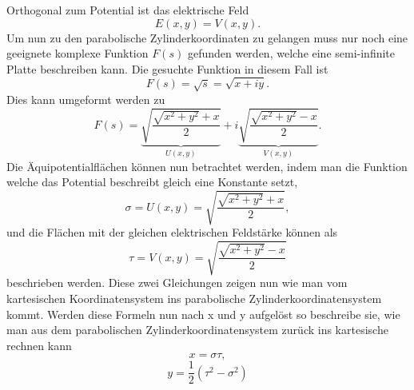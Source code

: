 Orthogonal zum Potential ist das elektrische Feld
\begin{equation}
	E(x,y) = V(x,y).
\end{equation}
Um nun zu den parabolische Zylinderkoordinaten zu gelangen muss nur noch eine geeignete komplexe Funktion $F(s)$ gefunden werden, 
welche eine semi-infinite Platte beschreiben kann.
Die gesuchte Funktion in diesem Fall ist
\begin{equation}
	F(s) 
	= 
	\sqrt{s} 
	= 
	\sqrt{x + iy}.
\end{equation}
Dies kann umgeformt werden zu
\begin{equation}
	F(s) 
	= 
	\underbrace{\sqrt{\frac{\sqrt{x^2+y^2} + x}{2}}}_{U(x,y)} 
	+ 
	i\underbrace{\sqrt{\frac{\sqrt{x^2+y^2} - x}{2}}}_{V(x,y)}
	.
\end{equation}
Die Äquipotentialflächen können nun betrachtet werden, indem man die Funktion welche das Potential beschreibt gleich eine Konstante setzt,
\begin{equation}
	\sigma = U(x,y) = \sqrt{\frac{\sqrt{x^2+y^2} + x}{2}},
\end{equation}
und die Flächen mit der gleichen elektrischen Feldstärke können als
\begin{equation}
	\tau = V(x,y) = \sqrt{\frac{\sqrt{x^2+y^2} - x}{2}}
\end{equation}
beschrieben werden. Diese zwei Gleichungen zeigen nun wie man vom kartesischen Koordinatensystem ins parabolische Zylinderkoordinatensystem kommt. Werden diese Formeln nun nach x und y aufgelöst so beschreibe sie, wie man aus dem parabolischen Zylinderkoordinatensystem zurück ins kartesische rechnen kann
\begin{equation}
	x = \sigma \tau,
\end{equation}
\begin{equation}
	y = \frac{1}{2}\left ( \tau^2 - \sigma^2 \right )
\end{equation}





